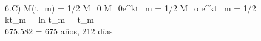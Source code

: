 \\6.C) \hspace{0.2cm} M(t_m) = 1/2 \hspace{0.1cm}M_0 \Longrightarrow M_0e^{kt_m} = 1/2 \hspace{0.1cm} M_o \Longrightarrow e^{kt_m} = 1/2\\
kt_m = ln \Longrightarrow t_m =   \Longrightarrow  t_m =  \\
675.582 = 675 \hspace{0.1cm} años, 212 \hspace{0.1cm} días
